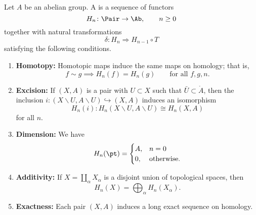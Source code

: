 \documentclass[main.tex]{subfiles}
\begin{document}
\begin{definition}
  \label{def:homology_theory}
  Let $A$ be an abelian group. A  is a sequence of functors
  \begin{equation*}
    H_{n}\colon \Pair \to \Ab,\qquad n \geq 0
  \end{equation*}
  together with natural transformations
  \begin{equation*}
    \delta\colon H_{n} \Rightarrow H_{n-1} \circ T
  \end{equation*}
  satisfying the following conditions.
  \begin{enumerate}
    \item \textbf{Homotopy:} Homotopic maps induce the same maps on homology; that is,
      \begin{equation*}
        f \sim g \implies H_{n}(f) = H_{n}(g) \qquad\text{for all } f, g, n.
      \end{equation*}

    \item \textbf{Excision:} If $(X, A)$ is a pair with $U \subset X$ such that $\bar{U} \subset \mathring{A}$, then the inclusion $i\colon (X\smallsetminus U, A \smallsetminus U) \hookrightarrow (X, A)$ induces an isomorphism
      \begin{equation*}
        H_{n}(i)\colon H_{n}(X\smallsetminus U, A\smallsetminus U) \cong H_{n}(X, A)
      \end{equation*}
      for all $n$.

    \item \textbf{Dimension:} We have
      \begin{equation*}
        H_{n}(\pt) =
        \begin{cases}
          A, &n = 0 \\
          0, &\text{otherwise}.
        \end{cases}
      \end{equation*}

    \item \textbf{Additivity:} If $X = \coprod_{\alpha} X_{\alpha}$ is a disjoint union of topological spaces, then
      \begin{equation*}
        H_{n}(X) = \bigoplus_{\alpha} H_{n}(X_{\alpha}).
      \end{equation*}

    \item \textbf{Exactness:} Each pair $(X, A)$ induces a long exact sequence on homology.
  \end{enumerate}
\end{definition}
\end{document}
